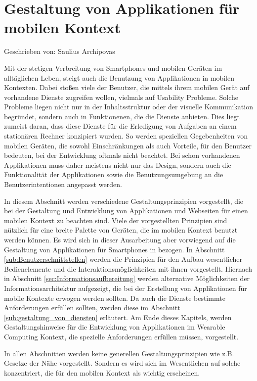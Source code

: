 
\section{Gestaltung von Applikationen für mobilen Kontext}

Geschrieben von: Saulius Archipovas

Mit der stetigen Verbreitung von Smartphones und mobilen Geräten im alltäglichen Leben, steigt auch die Benutzung von Applikationen in mobilen Kontexten. Dabei stoßen viele der Benutzer, die mittels ihrem mobilen Gerät auf vorhandene Dienste zugreifen wollen, vielmals auf Usability Probleme. Solche Probleme liegen nicht nur in der Inhaltsstruktur oder der visuelle Kommunikation begründet, sondern auch in Funktionenen, die die Dienste anbieten. Dies liegt zumeist daran, dass diese Dienste für die Erledigung von Aufgaben an einem stationären Rechner konzipiert wurden. So werden speziellen Gegebenheiten von mobilen Geräten, die sowohl Einschränkungen als auch Vorteile, für den Benutzer bedeuten, bei der Entwicklung oftmals nicht beachtet.
Bei schon vorhandenen Applikationen muss daher meistens nicht nur das Design, sondern auch die Funktionalität der Applikationen sowie die Benutzungsumgebung an die Benutzerintentionen angepasst werden. 


In diesem Abschnitt werden verschiedene Gestaltungsprinzipien vorgestellt, die bei der Gestaltung und Entwicklung von Applikationen und Webseiten  für einen mobilen Kontext zu beachten sind. Viele der vorgestellten Prinzipien sind nützlich für eine breite Palette von Geräten, die im mobilen Kontext benutzt werden können. Es wird sich in dieser Ausarbeitung aber vorwiegend auf die Gestaltung von Applikationen für Smartphones in bezogen. In Abschnitt \ref{sub:Benutzerschnittstellen} werden die Prinzipien für den Aufbau wesentlicher Bedienelemente und die Interaktionsmöglichkeiten mit ihnen vorgestellt. Hiernach in Abschnitt \ref{sec:Informationsaufbereitung} werden alternative Möglichkeiten der Informationsarchitektur  aufgezeigt, die bei der Erstellung von Applikationen für mobile Kontexte erwogen werden sollten. Da auch die Dienste bestimmte Anforderungen erfüllen sollten, werden diese im Abschnitt \ref{sub:gestaltung_von_diensten} erläutert. Am Ende dieses Kapitels, werden Gestaltungshinweise für die Entwicklung von Applikationen im Wearable Computing Kontext, die spezielle Anforderungen erfüllen müssen, vorgestellt.

In allen Abschnitten werden keine generellen Gestaltungsprinzipien wie z.B. Gesetze der Nähe vorgestellt. Sondern es wird sich im Wesentlichen auf solche konzentriert, die für den mobilen Kontext als wichtig erscheinen.

